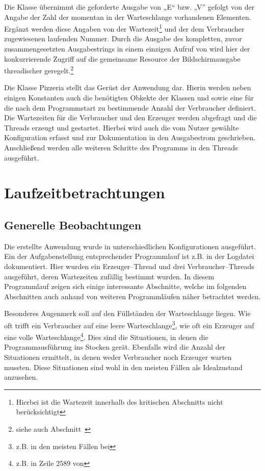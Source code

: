 Die Klasse  übernimmt die geforderte Ausgabe von „E“ bzw. „V” gefolgt von der Angabe der Zahl der momentan in der Warteschlange vorhandenen Elementen. Ergänzt werden diese Angaben von der Wartezeit\footnote{Hierbei ist die Wartezeit innerhalb des kritischen Abschnitts nicht berücksichtigt} und der dem Verbraucher zugewiesenen laufenden Nummer. Durch die Ausgabe des kompletten, zuvor zusammengesetzten Ausgabestrings in einem einzigen Aufruf von  wird hier der konkurrierende Zugriff auf die gemeinsame Resource der Bildschirmausgabe threadischer geregelt.\footnote{siehe auch Abschnitt~}

Die Klasse Pizzeria stellt das Gerüst der Anwendung dar. Hierin werden neben einigen Konstanten auch die benötigten Obkekte der Klassen  und  sowie eine  für die nach dem Programmstart zu bestimmende Anzahl der Verbraucher definiert. Die Wartezeiten für die Verbraucher und den Erzeuger werden abgefragt und die Threads erzeugt und gestartet. Hierbei wird auch die vom Nutzer gewählte Konfiguration erfasst und zur Dokumentation in den Ausgabestrom geschrieben. Anschließend werden alle weiteren Schritte des Programms in den Threads ausgeführt. 

\newpage
\section{Laufzeitbetrachtungen} %
\label{sec:laufzeitbetrachtungen}

\subsection{Generelle Beobachtungen} %
\label{sub:generelle_beobachtungen}
Die erstellte Anwendung wurde in unterschiedlichen Konfigurationen ausgeführt. Ein der Aufgabenstellung entsprechender Programmlauf ist z.B. in der Logdatei  dokumentiert. Hier wurden ein Erzeuger–Thread und drei Verbraucher–Threads ausgeführt, deren Wartezeiten zufällig bestimmt wurden. In diesem Programmlauf zeigen sich einige interessante Abschnitte, welche im folgenden Abschnitten auch anhand von weiteren Programmläufen näher betrachtet werden.

Besonderes Augenmerk soll auf den Füllständen der Warteschlange liegen. Wie oft trifft ein Verbraucher auf eine leere Warteschlange\footnote{z.B. in den meisten Fällen bei }, wie oft ein Erzeuger auf eine volle Warteschlange\footnote{z.B. in Zeile 2589 von }. Dies sind die Situationen, in denen die Programmausführung ins Stocken gerät. Ebenfalls wird die Anzahl der Situationen ermittelt, in denen weder Verbraucher noch Erzeuger warten mussten. Diese Situationen sind wohl in den meisten Fällen als Idealzustand anzusehen.

